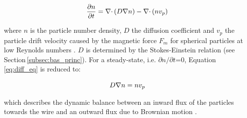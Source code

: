 \begin{equation}
\label{eq:diff_eq}
\centering
\frac{\partial n}{\partial t} = \nabla\cdotp(D\nabla n)-\nabla\cdotp(n v_{p})
\end{equation}

where $n$ is the particle number density, $D$ the diffusion coefficient and $v_{p}$ the particle drift velocity caused by the magnetic force $F_{m}$ for spherical particles at low Reynolds numbers \cite{fletcher1991fine,FranzrebHabil}. $D$ is determined by the Stokes-Einstein relation (see Section\,\ref{subsec:bas_princ}). For a steady-state, i.e. ${\partial n}/{\partial t}$=0, Equation\,\ref{eq:diff_eq} is reduced to:

\begin{equation}
\label{eq:diff_eq_2}
\centering
 D\nabla n = n v_{p}
\end{equation}

which describes the dynamic balance between an inward flux of the particles towards the wire and an outward flux due to Brownian motion \cite{fletcher1991fine}. 

\FloatBarrier

% 


% 
% 
% 

